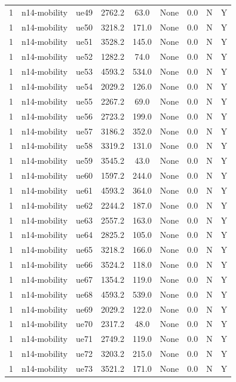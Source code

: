\begin{table}[ht]
\begin{tabular}{|c|c|c|c|c|c|c|c|c|}
1 & n14-mobility & ue49 & 2762.2 & 63.0 & None & 0.0 & N & Y \\
1 & n14-mobility & ue50 & 3218.2 & 171.0 & None & 0.0 & N & Y \\
1 & n14-mobility & ue51 & 3528.2 & 145.0 & None & 0.0 & N & Y \\
1 & n14-mobility & ue52 & 1282.2 & 74.0 & None & 0.0 & N & Y \\
1 & n14-mobility & ue53 & 4593.2 & 534.0 & None & 0.0 & N & Y \\
1 & n14-mobility & ue54 & 2029.2 & 126.0 & None & 0.0 & N & Y \\
1 & n14-mobility & ue55 & 2267.2 & 69.0 & None & 0.0 & N & Y \\
1 & n14-mobility & ue56 & 2723.2 & 199.0 & None & 0.0 & N & Y \\
1 & n14-mobility & ue57 & 3186.2 & 352.0 & None & 0.0 & N & Y \\
1 & n14-mobility & ue58 & 3319.2 & 131.0 & None & 0.0 & N & Y \\
1 & n14-mobility & ue59 & 3545.2 & 43.0 & None & 0.0 & N & Y \\
1 & n14-mobility & ue60 & 1597.2 & 244.0 & None & 0.0 & N & Y \\
1 & n14-mobility & ue61 & 4593.2 & 364.0 & None & 0.0 & N & Y \\
1 & n14-mobility & ue62 & 2244.2 & 187.0 & None & 0.0 & N & Y \\
1 & n14-mobility & ue63 & 2557.2 & 163.0 & None & 0.0 & N & Y \\
1 & n14-mobility & ue64 & 2825.2 & 105.0 & None & 0.0 & N & Y \\
1 & n14-mobility & ue65 & 3218.2 & 166.0 & None & 0.0 & N & Y \\
1 & n14-mobility & ue66 & 3524.2 & 118.0 & None & 0.0 & N & Y \\
1 & n14-mobility & ue67 & 1354.2 & 119.0 & None & 0.0 & N & Y \\
1 & n14-mobility & ue68 & 4593.2 & 539.0 & None & 0.0 & N & Y \\
1 & n14-mobility & ue69 & 2029.2 & 122.0 & None & 0.0 & N & Y \\
1 & n14-mobility & ue70 & 2317.2 & 48.0 & None & 0.0 & N & Y \\
1 & n14-mobility & ue71 & 2749.2 & 119.0 & None & 0.0 & N & Y \\
1 & n14-mobility & ue72 & 3203.2 & 215.0 & None & 0.0 & N & Y \\
1 & n14-mobility & ue73 & 3521.2 & 171.0 & None & 0.0 & N & Y \\

\end{tabular}
\end{table}
